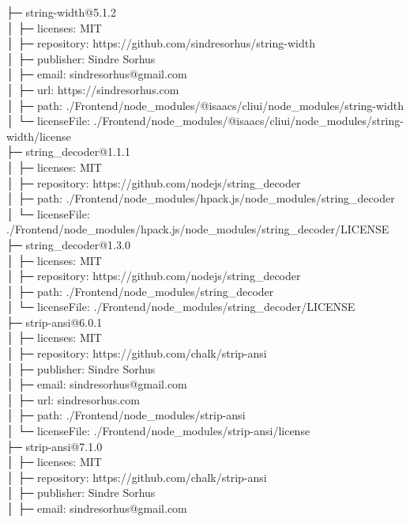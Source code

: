 ├─ string-width@5.1.2\\
│  ├─ licenses: MIT\\
│  ├─ repository: https://github.com/sindresorhus/string-width\\
│  ├─ publisher: Sindre Sorhus\\
│  ├─ email: sindresorhus@gmail.com\\
│  ├─ url: https://sindresorhus.com\\
│  ├─ path: ./Frontend/node\_modules/@isaacs/cliui/node\_modules/string-width\\
│  └─ licenseFile: ./Frontend/node\_modules/@isaacs/cliui/node\_modules/string-width/license\\
├─ string\_decoder@1.1.1\\
│  ├─ licenses: MIT\\
│  ├─ repository: https://github.com/nodejs/string\_decoder\\
│  ├─ path: ./Frontend/node\_modules/hpack.js/node\_modules/string\_decoder\\
│  └─ licenseFile: ./Frontend/node\_modules/hpack.js/node\_modules/string\_decoder/LICENSE\\
├─ string\_decoder@1.3.0\\
│  ├─ licenses: MIT\\
│  ├─ repository: https://github.com/nodejs/string\_decoder\\
│  ├─ path: ./Frontend/node\_modules/string\_decoder\\
│  └─ licenseFile: ./Frontend/node\_modules/string\_decoder/LICENSE\\
├─ strip-ansi@6.0.1\\
│  ├─ licenses: MIT\\
│  ├─ repository: https://github.com/chalk/strip-ansi\\
│  ├─ publisher: Sindre Sorhus\\
│  ├─ email: sindresorhus@gmail.com\\
│  ├─ url: sindresorhus.com\\
│  ├─ path: ./Frontend/node\_modules/strip-ansi\\
│  └─ licenseFile: ./Frontend/node\_modules/strip-ansi/license\\
├─ strip-ansi@7.1.0\\
│  ├─ licenses: MIT\\
│  ├─ repository: https://github.com/chalk/strip-ansi\\
│  ├─ publisher: Sindre Sorhus\\
│  ├─ email: sindresorhus@gmail.com\\
